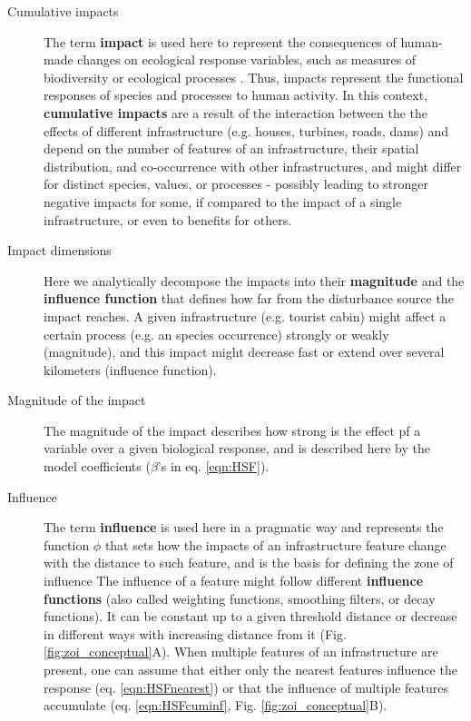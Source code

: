 \documentclass[titlepage]{article}
\begin{document}
\begin{tcolorbox}[width=1.3\textwidth,center,colback=yellow!5,colframe=yellow!75!black,title={Box 1 -- Definitions}]

\begin{description}

    \item[Cumulative impacts] The term \textbf{impact} is used here to represent the consequences of human-made changes on ecological response variables, such as measures of biodiversity or ecological processes \citep{naugle_unifying_2011}. Thus, impacts represent the functional responses of species and processes to human activity. In this context, \textbf{cumulative impacts} are a result of the interaction between the the effects of different infrastructure (e.g. houses, turbines, roads, dams) and depend on the number of features of an infrastructure, their spatial distribution, and co-occurrence with other infrastructures, and might differ for distinct species, values, or processes - possibly leading to stronger negative impacts for some, if compared to the impact of a single infrastructure, or even to benefits for others.
    
    \item[Impact dimensions] Here we analytically decompose the impacts into their \textbf{magnitude} and the \textbf{influence function} that defines how far from the disturbance source the impact reaches. A given infrastructure (e.g. tourist cabin) might affect a certain process (e.g. an species occurrence) strongly or weakly (magnitude), and this impact might decrease fast or extend over several kilometers (influence function).
    
    \item[Magnitude of the impact] The magnitude of the impact describes how strong is the effect pf a variable over a given biological response, and is described here by the model coefficients ($\beta$'s in eq. \ref{eqn:HSF}). 
    
    \item[Influence] The term \textbf{influence} is used here in a pragmatic way and represents the function $\phi$ that sets how the impacts of an infrastructure feature change with the distance to such feature, and is the basis for defining the zone of influence
    The influence of a feature might follow different \textbf{influence functions} (also called weighting functions, smoothing filters, or decay functions). It can be constant up to a given threshold distance or decrease in different ways with increasing distance from it (Fig. \ref{fig:zoi_conceptual}A). When multiple features of an infrastructure are present, one can assume that either only the nearest features influence the response (eq. \ref{eqn:HSFnearest}) or that the influence of multiple features accumulate (eq. \ref{eqn:HSFcuminf}, Fig. \ref{fig:zoi_conceptual}B).
    

\end{description}
\end{tcolorbox}
\end{document}

